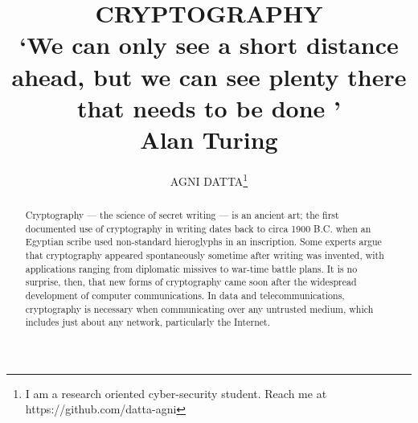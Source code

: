\documentclass[british]{report}
\providecommand{\printnomenclature}{\printglossary}
\begin{document}
\title{\textbf{\huge CRYPTOGRAPHY}
\\
{\normalsize \textquoteleft We can only see a short distance ahead, but we can see plenty there that needs to be done \textquoteright}
\\
{\normalsize Alan Turing} }
\author{AGNI DATTA\thanks{I am a research oriented cyber-security student. Reach me at https://github.com/datta-agni}}
\maketitle
\begin{abstract}
	{\normalsize{}Cryptography --- the science of secret writing ---
		is an ancient art; the first documented use of cryptography in writing
		dates back to circa 1900 B.C. when an Egyptian scribe used non-standard
		hieroglyphs in an inscription. Some experts argue that cryptography
		appeared spontaneously sometime after writing was invented, with applications
		ranging from diplomatic missives to war-time battle plans. It is no
		surprise, then, that new forms of cryptography came soon after the
		widespread development of computer communications. In data and telecommunications,
		cryptography is necessary when communicating over any untrusted medium,
		which includes just about any network, particularly the Internet.}{\normalsize\par}
\end{abstract}
\tableofcontents{}

\settowidth{\nomlabelwidth}{Decryption Algorithm}
\printnomenclature{}




\end{document}
